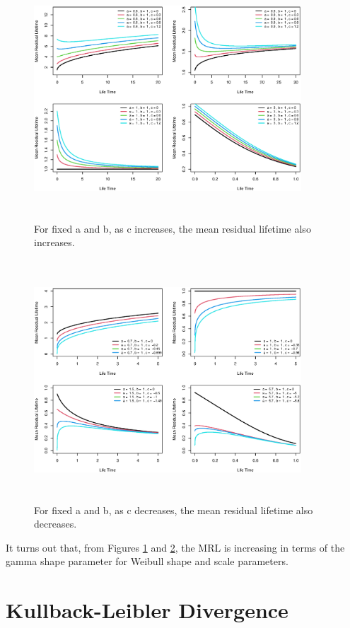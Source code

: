 \documentclass{ps}
\theoremstyle{plain}%
\theoremstyle{definition}
\theoremstyle{remark}
\begin{document}
\begin{figure}[h!]
	\centering	\includegraphics[width=10cm,height=9cm]{Figure41.eps}
	\caption{For fixed a and b, as c increases, the mean residual lifetime also increases.}
	\label{Figure41}
\end{figure}

\begin{figure}[h!]
	\centering	\includegraphics[width=10cm,height=9cm]{Figure51.eps}
	\caption{For fixed a and b, as c decreases, the mean residual lifetime also decreases.}
	\label{Figure51}
\end{figure}

It turns out that, from Figures \ref{Figure41} and \ref{Figure51}, the MRL is increasing in terms of the gamma shape parameter for Weibull shape and scale parameters.


\section{Kullback-Leibler Divergence }\label{sec05:information-analysis}
\end{document}
